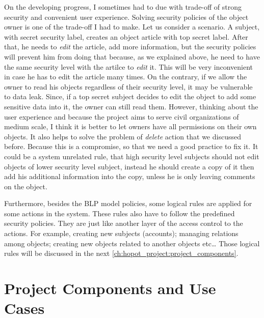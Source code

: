 On the developing progress, I sometimes had to due with trade-off of strong security and convenient user experience.
Solving security policies of the object owner is one of the trade-off I had to make.
Let us consider a scenario.
A subject, with secret security label, creates an object \eg article with top secret label. 
After that, he needs to \emph{edit} the article, \eg add more information, but the security policies will prevent him from doing that because, as we explained above, he need to have the same security level with the artilce to \emph{edit} it.
This will be very inconvenient in case he has to edit the article many times.
On the contrary, if we allow the owner to read his objects regardless of their security level, it may be vulnerable to data leak.
Since, if a top secret subject decides to edit the object to add some sensitive data into it, the owner can still read them.
However, thinking about the user experience and because the project aims to serve civil organizations of medium scale, I think it is better to let owners have all permissions on their own objects.
It also helps to solve the problem of \emph{delete} action that we discussed before.
Because this is a compromise, so that we need a good practice to fix it.
It could be a system unrelated rule, that high security level subjects should not edit objects of lower security level subject, instead he should create a copy of it then add his additional information into the copy, unless he is only leaving comments on the object.

Furthermore, besides the BLP model policies, some logical rules are applied for some actions in the system.
These rules also have to follow the predefined security policies.
They are just like another layer of the access control to the actions.
For example, creating new subjects (accounts); managing relations among objects; creating new objects related to another objects etc\dots
Those logical rules will be discussed in the next \autoref{ch:hopot_project:project_components}.

\section{Project Components and Use Cases}
\label{ch:hopot_project:project_components}

